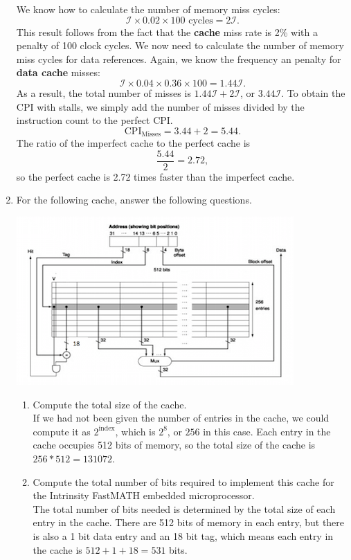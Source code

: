 \documentclass{article}
\begin{document}
\begin{enumerate}
We know how to calculate the number of memory miss cycles:
\[
\mathcal{I}\times 0.02\times 100\text{ cycles} = 2\mathcal{I}.
\]
This result follows from the fact that the \textbf{cache} miss rate is 2\% with a penalty of 100 clock cycles.
We now need to calculate the number of memory miss cycles for data references.
Again, we know the frequency an penalty for \textbf{data cache} misses:
\[
\mathcal{I}\times 0.04\times 0.36\times 100 = 1.44\mathcal{I}.
\]
As a result, the total number of misses is $1.44\mathcal{I} + 2\mathcal{I}$, or $3.44\mathcal{I}$.
To obtain the CPI with stalls, we simply add the number of misses divided by the instruction count to the perfect CPI.
\[
\text{CPI}_{\text{Misses}} = 3.44 + 2 = 5.44.
\]
The ratio of the imperfect cache to the perfect cache is
\[
\frac{5.44}{2} = 2.72,
\]
so the perfect cache is 2.72 times faster than the imperfect cache.
\item For the following cache, answer the following questions.
\begin{center}
\includegraphics[scale=0.7]{hw5_graphic}
\end{center}
\begin{enumerate}
\item Compute the total size of the cache.\\
If we had not been given the number of entries in the cache, we could compute it as $2^{\text{index}}$, which is $2^{8}$, or $256$ in this case.
Each entry in the cache occupies 512 bits of memory, so the total size of the cache is $256 * 512 = 131072$.
\item Compute the total number of bits required to implement this cache for the Intrinsity FastMATH embedded microprocessor.\\
The total number of bits needed is determined by the total size of each entry in the cache.
There are 512 bits of memory in each entry, but there is also a 1 bit data entry and an 18 bit tag, which means each entry in the cache is $512 + 1 + 18 = 531$ bits.

\end{enumerate}
\end{enumerate}
\end{document}
